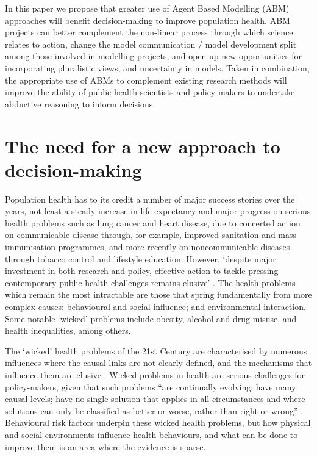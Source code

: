 \documentclass[review]{elsarticle}
\begin{document}
In this paper we propose that greater use of Agent Based Modelling (ABM) approaches will benefit decision-making to improve population health. ABM projects can better complement the non-linear process through which science relates to action, change the model communication / model development split among those involved in modelling projects, and open up new opportunities for incorporating pluralistic views, and uncertainty in models. Taken in combination, the appropriate use of ABMs to complement existing research methods will improve the ability of public health scientists and policy makers to undertake abductive reasoning to inform decisions.


\section{The need for a new approach to decision-making}


Population health has to its credit a number of major success stories over the years, not least a steady increase in life expectancy and major progress on serious health problems such as lung cancer and heart disease, due to concerted action on communicable disease through, for example, improved sanitation and mass immunisation programmes, and more recently on noncommunicable diseases through tobacco control and lifestyle education.  However, `despite major investment in both research and policy, effective action to tackle pressing contemporary public health challenges remains elusive' \citep{rutter2017}. The health problems which remain the most intractable are those that spring fundamentally from more complex causes: behavioural and social influence; and environmental interaction.  Some notable `wicked' problems include obesity, alcohol and drug misuse, and health inequalities, among others.

The `wicked' health problems of the 21st Century are characterised by numerous influences where the causal links are not clearly defined, and the mechanisms that influence them are elusive \citep{rittel1973}. Wicked problems in health are serious challenges for policy-makers, given that such problems ``are continually evolving; have many causal levels; have no single solution that applies in all circumstances and where solutions can only be classified as better or worse, rather than right or wrong'' \citep{signal2013}.  Behavioural risk factors underpin these wicked health problems, but how physical and social environments influence health behaviours, and what can be done to improve them is an area where the evidence is sparse. 
\end{document}
